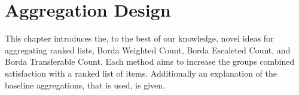 \chapter{Aggregation Design}

This chapter introduces the, to the best of our knowledge, novel ideas for aggregating ranked lists, Borda Weighted Count, Borda Escaleted Count, and Borda Transferable Count. Each method aims to increase the groups combined satisfaction with a ranked list of items. Additionally an explanation of the baseline aggregations, that is used, is given.


